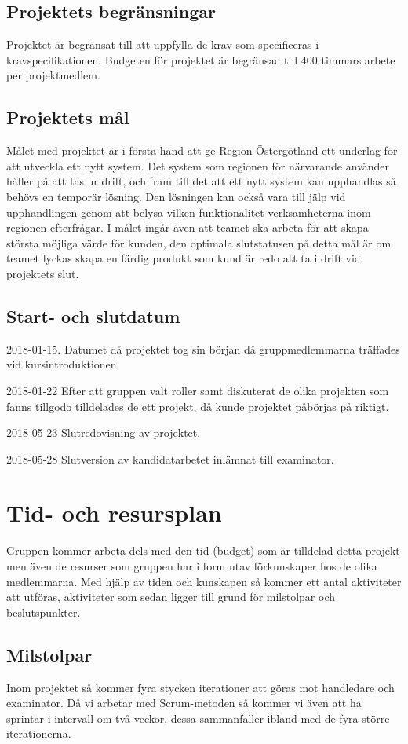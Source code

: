 \documentclass[a4paper,10pt]{article}
\begin{document}
\subsection{Projektets begränsningar}
Projektet är begränsat till att uppfylla de krav som specificeras i kravspecifikationen. Budgeten för projektet är begränsad till 400 timmars arbete per projektmedlem.
\subsection{Projektets mål}
Målet med projektet är i första hand att ge Region Östergötland ett underlag för att utveckla ett nytt system. Det system som regionen för närvarande använder håller på att tas ur drift, och fram till det att ett nytt system kan upphandlas så behövs en temporär lösning. Den lösningen kan också vara till jälp vid upphandlingen genom att belysa vilken funktionalitet verksamheterna inom regionen efterfrågar. I målet ingår även att teamet ska arbeta för att skapa största möjliga värde för kunden, den optimala slutstatusen på detta mål är om teamet lyckas skapa en färdig produkt som kund är redo att ta i drift vid projektets slut.
\subsection{Start- och slutdatum}
2018-01-15.
Datumet då projektet tog sin början då gruppmedlemmarna träffades vid kursintroduktionen.

2018-01-22
Efter att gruppen valt roller samt diskuterat de olika projekten som fanns tillgodo tilldelades de ett projekt, då kunde projektet påbörjas på riktigt.

2018-05-23
Slutredovisning av projektet.

2018-05-28
Slutversion av kandidatarbetet inlämnat till examinator.

\newpage

\section{Tid- och resursplan}
Gruppen kommer arbeta dels med den tid (budget) som är tilldelad detta projekt men även de resurser som gruppen har i form utav förkunskaper hos de olika medlemmarna. Med hjälp av tiden och kunskapen så kommer ett antal aktiviteter att utföras, aktiviteter som sedan ligger till grund för milstolpar och beslutspunkter.
\subsection{Milstolpar}
Inom projektet så kommer fyra stycken iterationer att göras mot handledare och examinator. Då vi arbetar med Scrum-metoden så kommer vi även att ha sprintar i intervall om två veckor, dessa sammanfaller ibland med de fyra större iterationerna.
\end{document}
